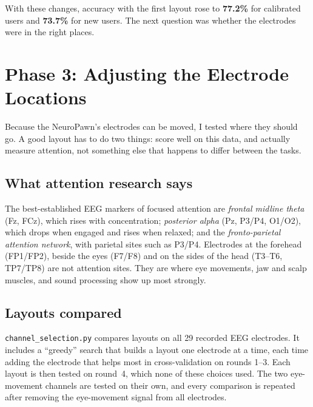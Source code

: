 \documentclass[12pt]{article}
\begin{document}
With these changes, accuracy with the first layout rose to \textbf{77.2\%} for calibrated users and \textbf{73.7\%} for new users. The next question was whether the electrodes were in the right places.

\section{Phase 3: Adjusting the Electrode Locations}

Because the NeuroPawn's electrodes can be moved, I tested where they should go. A good layout has to do two things: score well on this data, and actually measure attention, not something else that happens to differ between the tasks.

\subsection{What attention research says}

The best-established EEG markers of focused attention are \emph{frontal midline theta} (Fz, FCz), which rises with concentration; \emph{posterior alpha} (Pz, P3/P4, O1/O2), which drops when engaged and rises when relaxed; and the \emph{fronto-parietal attention network}, with parietal sites such as P3/P4. Electrodes at the forehead (FP1/FP2), beside the eyes (F7/F8) and on the sides of the head (T3--T6, TP7/TP8) are not attention sites. They are where eye movements, jaw and scalp muscles, and sound processing show up most strongly.

\subsection{Layouts compared}

\texttt{channel\_selection.py} compares layouts on all 29 recorded EEG electrodes. It includes a ``greedy'' search that builds a layout one electrode at a time, each time adding the electrode that helps most in cross-validation on rounds 1--3. Each layout is then tested on round~4, which none of these choices used. The two eye-movement channels are tested on their own, and every comparison is repeated after removing the eye-movement signal from all electrodes.
\end{document}
